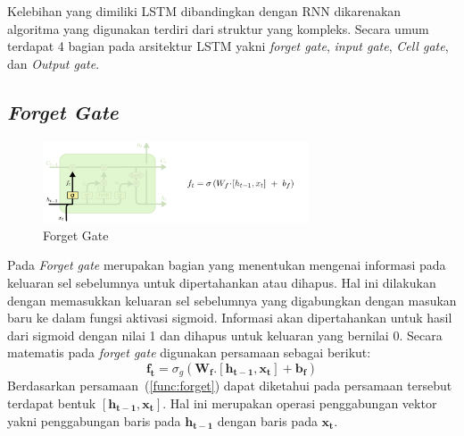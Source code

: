 Kelebihan yang dimiliki LSTM dibandingkan dengan RNN dikarenakan algoritma yang digunakan terdiri dari struktur yang kompleks. Secara umum terdapat 4 bagian pada arsitektur LSTM yakni \textit{forget gate}, \textit{input gate}, \textit{Cell gate}, dan \textit{Output gate}. 
\subsection{\textit{Forget Gate}}
\begin{figure}[h]
	\begin{center}
		\includegraphics[width=0.7\textwidth]{BAB-2/figures/LSTM3-focus-f.png}	
		\caption{Forget Gate \cite{olah2015understanding}}
		\label{gambar:forget gate}
	\end{center}
\end{figure}
Pada \textit{Forget gate} merupakan bagian yang menentukan mengenai informasi pada keluaran sel sebelumnya untuk dipertahankan atau dihapus. Hal ini dilakukan dengan memasukkan keluaran sel sebelumnya yang digabungkan dengan masukan baru ke dalam fungsi aktivasi sigmoid. Informasi akan dipertahankan untuk hasil dari sigmoid dengan nilai 1 dan dihapus untuk keluaran yang bernilai 0. Secara matematis pada \textit{forget gate} digunakan persamaan sebagai berikut:
\begin{equation}
	\boldsymbol{f_t} = \sigma_g(\boldsymbol{W_{f}}.[\boldsymbol{h_{t-1}}, \boldsymbol{x_t}] + \boldsymbol{b_f})
	\label{func:forget}
\end{equation} 
Berdasarkan persamaan~(\ref{func:forget}) dapat diketahui pada persamaan tersebut terdapat bentuk $[\boldsymbol{h_{t-1}}, \boldsymbol{x_t}]$. Hal ini merupakan operasi penggabungan vektor yakni penggabungan baris pada $\boldsymbol{h_{t-1}}$ dengan baris pada $\boldsymbol{x_t}$.
